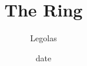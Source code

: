 \documentclass[english]{beamer} %
\begin{document}
\title[LOR]{The Ring}
\date{date}
\author{Legolas}


\begin{frame}

\end{frame}
\begin{frame}
 
\end{frame}
\end{document}
